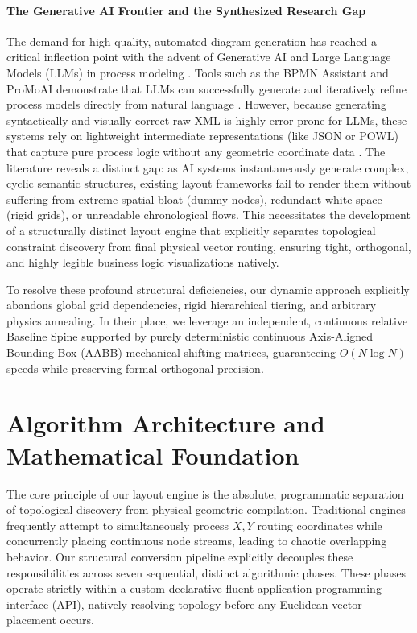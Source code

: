 \documentclass[fleqn,10pt]{wlscirep}
\begin{document}
\paragraph{The Generative AI Frontier and the Synthesized Research Gap}
The demand for high-quality, automated diagram generation has reached a critical inflection point with the advent of Generative AI and Large Language Models (LLMs) in process modeling \cite{ref_kourani_llm}. Tools such as the BPMN Assistant and ProMoAI demonstrate that LLMs can successfully generate and iteratively refine process models directly from natural language \cite{ref_licardo, ref_kourani_promoai, ref_nivon}. However, because generating syntactically and visually correct raw XML is highly error-prone for LLMs, these systems rely on lightweight intermediate representations (like JSON or POWL) that capture pure process logic without any geometric coordinate data \cite{ref_licardo, ref_kourani_promoai}. The literature reveals a distinct gap: as AI systems instantaneously generate complex, cyclic semantic structures, existing layout frameworks fail to render them without suffering from extreme spatial bloat (dummy nodes), redundant white space (rigid grids), or unreadable chronological flows. This necessitates the development of a structurally distinct layout engine that explicitly separates topological constraint discovery from final physical vector routing, ensuring tight, orthogonal, and highly legible business logic visualizations natively.

To resolve these profound structural deficiencies, our dynamic approach explicitly abandons global grid dependencies, rigid hierarchical tiering, and arbitrary physics annealing. In their place, we leverage an independent, continuous relative Baseline Spine supported by purely deterministic continuous Axis-Aligned Bounding Box (AABB) mechanical shifting matrices, guaranteeing $O(N \log N)$ speeds while preserving formal orthogonal precision.

\section*{Algorithm Architecture and Mathematical Foundation}
The core principle of our layout engine is the absolute, programmatic separation of topological discovery from physical geometric compilation. Traditional engines frequently attempt to simultaneously process $X,Y$ routing coordinates while concurrently placing continuous node streams, leading to chaotic overlapping behavior. Our structural conversion pipeline explicitly decouples these responsibilities across seven sequential, distinct algorithmic phases. These phases operate strictly within a custom declarative fluent application programming interface (API), natively resolving topology before any Euclidean vector placement occurs.
\end{document}
